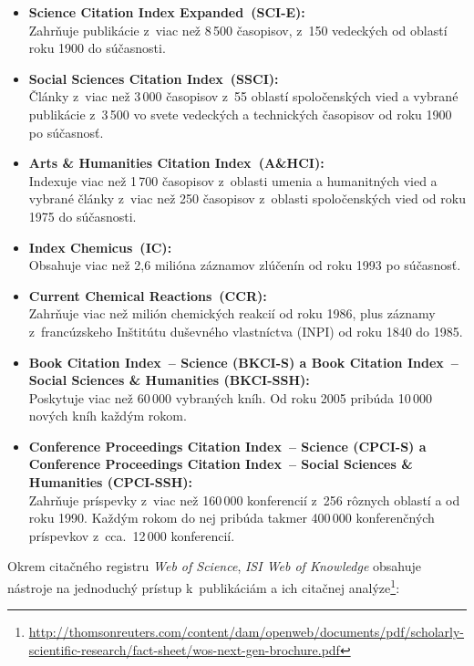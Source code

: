 \begin{itemize}
\item \textbf{Science Citation Index Expanded\R\ (SCI-E):}\\
  Zahrňuje publikácie z~viac než 8\,500 časopisov, z~150 vedeckých od oblastí
  roku 1900 do súčasnosti.
\item \textbf{Social Sciences Citation Index\R\ (SSCI):}\\
  Články z~viac než 3\,000 časopisov z~55 oblastí spoločenských vied a vybrané
  publikácie z~3\,500 vo svete vedeckých a technických časopisov od roku 1900 po
  súčasnosť.
\item \textbf{Arts \& Humanities Citation Index\R\ (A\&HCI):}\\
  Indexuje viac než 1\,700 časopisov z~oblasti umenia a humanitných vied a
  vybrané články z~viac než 250 časopisov z~oblasti spoločenských vied od roku
  1975 do súčasnosti.
\item \textbf{Index Chemicus\R\ (IC):}\\
  Obsahuje viac než 2,6 milióna záznamov zlúčenín od roku 1993 po súčasnosť.
\item \textbf{Current Chemical Reactions\R\ (CCR):}\\
  Zahrňuje viac než milión chemických reakcií od roku 1986, plus záznamy
  z~francúzskeho Inštitútu duševného vlastníctva (INPI) od roku 1840 do 1985.
\item \textbf{Book Citation Index\R\ -- Science (BKCI-S) a Book Citation
    Index\R\ -- Social Sciences \& Humanities (BKCI-SSH):}\\
  Poskytuje viac než 60\,000 vybraných kníh.  Od roku 2005 pribúda 10\,000
  nových kníh každým rokom.
\item \textbf{Conference Proceedings Citation Index\R\ -- Science (CPCI-S) a
    Conference Proceedings Citation Index\R\ -- Social Sciences \& Humanities
    (CPCI-SSH):}\\ Zahrňuje príspevky z~viac než 160\,000 konferencií z~256
  rôznych oblastí  a  od roku 1990.  Každým rokom do nej pribúda takmer 400\,000
  konferenčných príspevkov z~cca.~12\,000 konferencií.
\end{itemize}


Okrem citačného registru \emph{Web of Science}, \emph{ISI Web of Knowledge}
obsahuje nástroje na jednoduchý prístup k~publikáciám a ich citačnej
analýze\footnote{\url{http://thomsonreuters.com/content/dam/openweb/documents/pdf/scholarly-scientific-research/fact-sheet/wos-next-gen-brochure.pdf}}:

